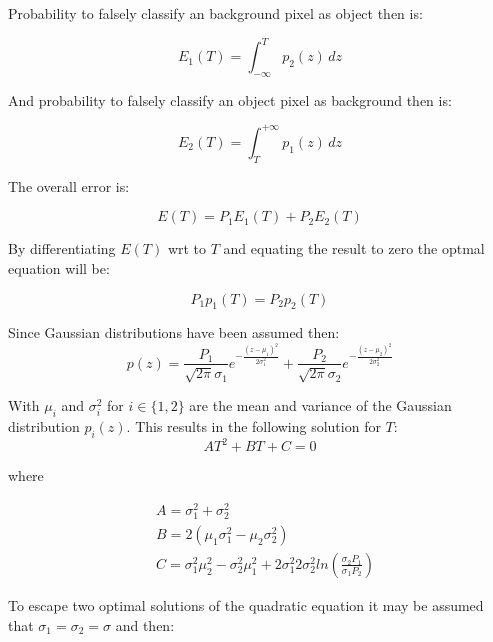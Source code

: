 Probability to falsely classify an background pixel as object then is:

\begin{equation}
    E_1(T) = \int_{-\infty}^T{p_2(z) \, dz}
\end{equation}

And probability to falsely classify an object pixel as background then is:

\begin{equation}
    E_2(T) = \int_T^{+\infty}{p_1(z) \, dz}
\end{equation}

The overall error is:

\begin{equation}
    E(T) = P_1E_1(T) + P_2E_2(T)
\end{equation}

By differentiating $E(T)$ wrt to $T$ and equating the result to zero the optmal equation will be:

\begin{equation}
    P_1p_1(T) = P_2p_2(T)
\end{equation}

Since Gaussian distributions have been assumed then:
\begin{equation}
    p(z) = \frac{P_1}{\sqrt{2\pi} \sigma_1}e^{-\frac{(z-\mu_1)^2}{2\sigma_1^2}} + \frac{P_2}{\sqrt{2\pi} \sigma_2}e^{-\frac{(z-\mu_2)^2}{2\sigma_2^2}}
\end{equation}

With $\mu_i$ and $\sigma_i^2$ for $i \in \{1, 2\}$ are the mean and variance of the Gaussian distribution $p_i(z)$. This results in the following solution for $T$:
\begin{equation}
    AT^2 + BT + C = 0
\end{equation}

where 

\begin{equation}
    \begin{split}
        &A = \sigma_1^2 + \sigma_2^2 \\
        &B = 2(\mu_1 \sigma_1^2 - \mu_2 \sigma_2^2) \\
        &C = \sigma_1^2 \mu_2^2 - \sigma_2^2 \mu_1^2 + 2\sigma_1^2 2\sigma_2^2ln\left(\frac{\sigma_2P_1}{\sigma_1P_2}\right)
    \end{split}
\end{equation}

To escape two optimal solutions of the quadratic equation it may be assumed that $\sigma_1 = \sigma_2 = \sigma$ and then:

